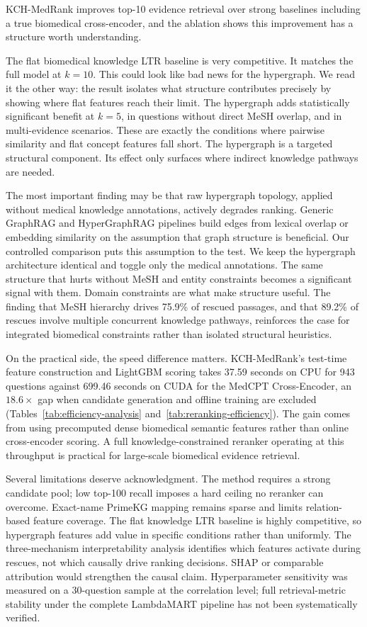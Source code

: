 KCH-MedRank improves top-10 evidence retrieval over strong baselines including a true biomedical cross-encoder, and the ablation shows this improvement has a structure worth understanding.

The flat biomedical knowledge LTR baseline is very competitive. It matches the full model at $k{=}10$. This could look like bad news for the hypergraph. We read it the other way: the result isolates what structure contributes precisely by showing where flat features reach their limit. The hypergraph adds statistically significant benefit at $k{=}5$, in questions without direct MeSH overlap, and in multi-evidence scenarios. These are exactly the conditions where pairwise similarity and flat concept features fall short. The hypergraph is a targeted structural component. Its effect only surfaces where indirect knowledge pathways are needed.

The most important finding may be that raw hypergraph topology, applied without medical knowledge annotations, actively degrades ranking. Generic GraphRAG and HyperGraphRAG pipelines build edges from lexical overlap or embedding similarity on the assumption that graph structure is beneficial. Our controlled comparison puts this assumption to the test. We keep the hypergraph architecture identical and toggle only the medical annotations. The same structure that hurts without MeSH and entity constraints becomes a significant signal with them. Domain constraints are what make structure useful. The finding that MeSH hierarchy drives 75.9\% of rescued passages, and that 89.2\% of rescues involve multiple concurrent knowledge pathways, reinforces the case for integrated biomedical constraints rather than isolated structural heuristics.

On the practical side, the speed difference matters. KCH-MedRank's test-time feature construction and LightGBM scoring takes 37.59 seconds on CPU for 943 questions against 699.46 seconds on CUDA for the MedCPT Cross-Encoder, an $18.6\times$ gap when candidate generation and offline training are excluded (Tables~\ref{tab:efficiency-analysis} and~\ref{tab:reranking-efficiency}). The gain comes from using precomputed dense biomedical semantic features rather than online cross-encoder scoring. A full knowledge-constrained reranker operating at this throughput is practical for large-scale biomedical evidence retrieval.




Several limitations deserve acknowledgment. The method requires a strong candidate pool; low top-100 recall imposes a hard ceiling no reranker can overcome. Exact-name PrimeKG mapping remains sparse and limits relation-based feature coverage. The flat knowledge LTR baseline is highly competitive, so hypergraph features add value in specific conditions rather than uniformly. The three-mechanism interpretability analysis identifies which features activate during rescues, not which causally drive ranking decisions. SHAP or comparable attribution would strengthen the causal claim. Hyperparameter sensitivity was measured on a 30-question sample at the correlation level; full retrieval-metric stability under the complete LambdaMART pipeline has not been systematically verified.

